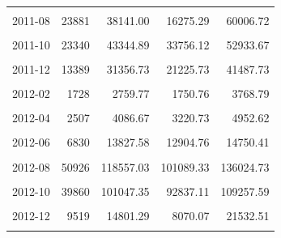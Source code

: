 \begin{longtable}[t]{crrrr}
\cellcolor{gray!10}{2011-07} & \cellcolor{gray!10}{9768} & \cellcolor{gray!10}{18963.22} & \cellcolor{gray!10}{15368.11} & \cellcolor{gray!10}{22558.34}\\
2011-08 & 23881 & 38141.00 & 16275.29 & 60006.72\\
\cellcolor{gray!10}{2011-09} & \cellcolor{gray!10}{55031} & \cellcolor{gray!10}{138209.83} & \cellcolor{gray!10}{129090.27} & \cellcolor{gray!10}{147329.39}\\
2011-10 & 23340 & 43344.89 & 33756.12 & 52933.67\\
\cellcolor{gray!10}{2011-11} & \cellcolor{gray!10}{18541} & \cellcolor{gray!10}{32364.92} & \cellcolor{gray!10}{26564.90} & \cellcolor{gray!10}{38164.95}\\
2011-12 & 13389 & 31356.73 & 21225.73 & 41487.73\\
\cellcolor{gray!10}{2012-01} & \cellcolor{gray!10}{2978} & \cellcolor{gray!10}{4390.61} & \cellcolor{gray!10}{2748.91} & \cellcolor{gray!10}{6032.32}\\
2012-02 & 1728 & 2759.77 & 1750.76 & 3768.79\\
\cellcolor{gray!10}{2012-03} & \cellcolor{gray!10}{2509} & \cellcolor{gray!10}{4834.39} & \cellcolor{gray!10}{3465.50} & \cellcolor{gray!10}{6203.29}\\
2012-04 & 2507 & 4086.67 & 3220.73 & 4952.62\\
\cellcolor{gray!10}{2012-05} & \cellcolor{gray!10}{3987} & \cellcolor{gray!10}{7454.41} & \cellcolor{gray!10}{6878.54} & \cellcolor{gray!10}{8030.29}\\
2012-06 & 6830 & 13827.58 & 12904.76 & 14750.41\\
\cellcolor{gray!10}{2012-07} & \cellcolor{gray!10}{14868} & \cellcolor{gray!10}{22423.11} & \cellcolor{gray!10}{19998.58} & \cellcolor{gray!10}{24847.65}\\
2012-08 & 50926 & 118557.03 & 101089.33 & 136024.73\\
\cellcolor{gray!10}{2012-09} & \cellcolor{gray!10}{63408} & \cellcolor{gray!10}{170966.09} & \cellcolor{gray!10}{160113.48} & \cellcolor{gray!10}{181818.70}\\
2012-10 & 39860 & 101047.35 & 92837.11 & 109257.59\\
\cellcolor{gray!10}{2012-11} & \cellcolor{gray!10}{18114} & \cellcolor{gray!10}{30726.63} & \cellcolor{gray!10}{24906.97} & \cellcolor{gray!10}{36546.29}\\
2012-12 & 9519 & 14801.29 & 8070.07 & 21532.51\\
\cellcolor{gray!10}{2013-01} & \cellcolor{gray!10}{2544} & \cellcolor{gray!10}{2752.65} & \cellcolor{gray!10}{822.24} & \cellcolor{gray!10}{4683.05}\\

\end{longtable}
